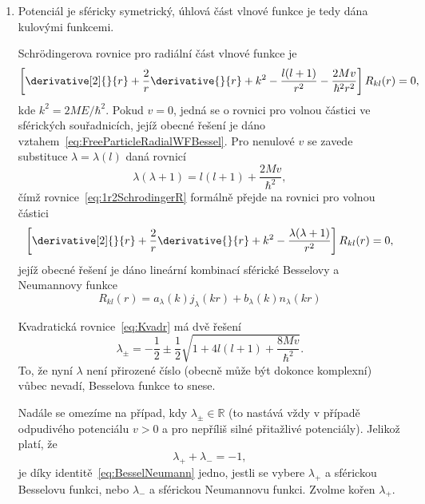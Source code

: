 \begin{solution}
	\begin{enumerate}
		\item 
		Potenciál je sféricky symetrický, úhlová část vlnové funkce je tedy dána kulovými funkcemi.

		Schrödingerova rovnice pro radiální část vlnové funkce je
		\begin{equation}\label{eq:1r2SchrodingerR}
			\left[\derivative[2]{}{r}+\frac{2}{r}\derivative{}{r}+k^{2}-\frac{l(l+1)}{r^{2}}-\frac{2Mv}{\hbar^{2}r^{2}}\right]R_{kl}(r)=0,
		\end{equation}
		kde $k^{2}=2ME/\hbar^{2}$. 
		Pokud $v=0$, jedná se o rovnici pro volnou částici ve sférických souřadnicích, jejíž obecné řešení je dáno vztahem~\eqref{eq:FreeParticleRadialWFBessel}.
		Pro nenulové $v$ se zavede substituce $\lambda=\lambda(l)$ daná rovnicí
		\begin{equation}\label{eq:Kvadr}
			\lambda(\lambda+1)=l(l+1)+\frac{2Mv}{\hbar^{2}},
		\end{equation}
		čímž rovnice~\ref{eq:1r2SchrodingerR} formálně přejde na rovnici pro volnou částici
		\begin{equation}
			\left[\derivative[2]{}{r}+\frac{2}{r}\derivative{}{r}+k^{2}-\frac{\lambda(\lambda+1)}{r^{2}}\right]R_{kl}(r)=0,
		\end{equation}
		jejíž obecné řešení je dáno lineární kombinací sférické Besselovy a Neumannovy funkce
		\begin{equation}
			R_{kl}(r)=a_{\lambda}(k)j_{\lambda}(kr)+b_{\lambda}(k)n_{\lambda}(kr)
		\end{equation}
	
		Kvadratická rovnice~\eqref{eq:Kvadr} má dvě řešení
		\begin{equation}
			\lambda_{\pm}=-\frac{1}{2}\pm\frac{1}{2}\sqrt{1+4l(l+1)+\frac{8Mv}{\hbar^{2}}}.
		\end{equation}
		To, že nyní $\lambda$ není přirozené číslo (obecně může být dokonce komplexní) vůbec nevadí, Besselova funkce to snese. 
	
		Nadále se omezíme na případ, kdy $\lambda_{\pm}\in\mathbb{R}$ (to nastává vždy v případě odpudivého potenciálu $v>0$ a pro nepříliš silné přitažlivé potenciály).
		Jelikož platí, že
		\begin{equation}
			\lambda_{+}+\lambda_{-}=-1,
		\end{equation}
		je díky identitě~\eqref{eq:BesselNeumann} jedno, jestli se vybere $\lambda_{+}$ a sférickou Besselovu funkci, nebo $\lambda_{-}$ a sférickou Neumannovu funkci.
		Zvolme kořen $\lambda_{+}$.


\end{enumerate}
\end{solution}
